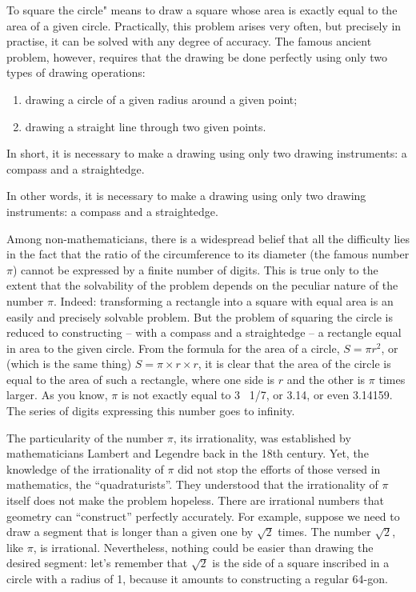 To square the circle" means to draw a square whose area is exactly equal to the area of a given circle. Practically, this problem arises very often, but precisely in practise, it can be solved with any degree of accuracy. The famous ancient problem, however, requires that the drawing be done perfectly using only two types of drawing operations: 
\begin{enumerate}
\item drawing a circle of a given radius around a given point; 
\item drawing a straight line through two given points.
\end{enumerate}
In short, it is necessary to make a drawing using only two drawing instruments: a compass and a straightedge.


In other words, it is necessary to make a drawing using only two drawing instruments: a compass and a straightedge.

Among non-mathematicians, there is a widespread belief that all the difficulty lies in the fact that the ratio of the circumference to its diameter (the famous number $\pi$) cannot be expressed by a finite number of digits. This is true only to the extent that the solvability of the problem depends on the peculiar nature of the number $\pi$. Indeed: transforming a rectangle into a square with equal area is an easily and precisely solvable problem. But the problem of squaring the circle is reduced to constructing -- with a compass and a straightedge -- a rectangle equal in area to the given circle. From the formula for the area of a circle, $S = \pi r^2$, or (which is the same thing) $S = \pi \times r \times r$, it is clear that the area of the circle is equal to the area of such a rectangle, where one side is $r$ and the other is $\pi$ times larger. As you know, $\pi$ is not exactly equal to 3 \, 1/7, or 3.14, or even 3.14159. The series of digits expressing this number goes to infinity.

The particularity of the number $\pi$, its irrationality, was established by mathematicians Lambert and Legendre back in the 18th century. Yet, the knowledge of the irrationality of $\pi$ did not stop the efforts of those versed in mathematics, the ``quadraturists''. They understood that the irrationality of $\pi$ itself does not make the problem hopeless. There are irrational numbers that geometry can ``construct'' perfectly accurately. For example, suppose we need to draw a segment that is longer than a given one by $\sqrt{2}$ times. The number $\sqrt{2}$, like $\pi$, is irrational. Nevertheless, nothing could be easier than drawing the desired segment: let's remember that $\sqrt{2}$ is the side of a square inscribed in a circle with a radius of 1, because it amounts to constructing a regular 64-gon.



